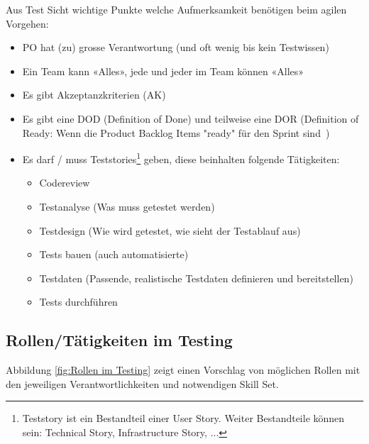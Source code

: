 Aus Test Sicht wichtige Punkte welche Aufmerksamkeit benötigen beim agilen Vorgehen:
\begin{itemize}
    \item PO hat (zu) grosse Verantwortung (und oft wenig bis kein Testwissen)
    \item Ein Team kann «Alles», jede und jeder im Team können «Alles»
    \item Es gibt Akzeptanzkriterien (AK)
    \item Es gibt eine DOD (Definition of Done) und teilweise eine DOR (Definition of Ready: Wenn die Product Backlog Items "ready" für den Sprint sind~\cite{scrum-events.de})
    \item Es darf / muss Teststories\footnote{Teststory ist ein Bestandteil einer User Story. Weiter Bestandteile können sein: Technical Story, Infrastructure Story, ...} geben, diese beinhalten folgende Tätigkeiten:
    \begin{itemize}
        \item Codereview
        \item Testanalyse (Was muss getestet werden)
        \item Testdesign (Wie wird getestet, wie sieht der Testablauf aus)
        \item Tests bauen (auch automatisierte)
        \item Testdaten (Passende, realistische Testdaten definieren und bereitstellen)
        \item Tests durchführen
    \end{itemize}   
\end{itemize}

\subsection{Rollen/Tätigkeiten im Testing}

Abbildung \ref{fig:Rollen im Testing} zeigt einen Vorschlag von möglichen Rollen mit den jeweiligen Verantwortlichkeiten und notwendigen Skill Set.

